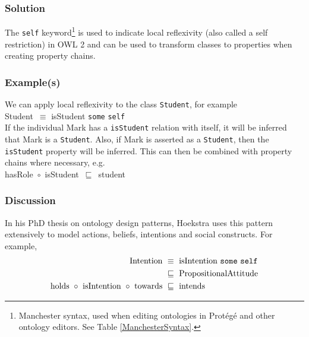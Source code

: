 \subsubsection{Solution}

\label{LocalReflexivity}
The \texttt{self} keyword\footnote{Manchester syntax, used when editing ontologies in Prot\'eg\'e and other ontology editors. See Table \ref{ManchesterSyntax}.} is used to indicate local reflexivity (also called a self restriction) in \ac{OWL} 2 and can be used to transform classes to properties when creating property chains.

\subsubsection{Example(s)}

We can apply local reflexivity to the class \texttt{Student}, for example\\

\noindent
Student~\ensuremath{\equiv} isStudent \texttt{some} \texttt{self}\\

If the individual Mark has a \texttt{isStudent} relation with itself, it will be inferred that Mark is a \texttt{Student}. Also, if Mark is asserted as a \texttt{Student}, then the \texttt{isStudent} property will be inferred. This can then be combined with property chains where necessary, e.g.\\

\noindent
hasRole~\ensuremath{\circ}~isStudent~\ensuremath{\sqsubseteq}~student

\subsubsection{Discussion}

In his PhD thesis on ontology design patterns, Hoekstra \cite{Hoekstra2009} uses this pattern extensively to model actions, beliefs, intentions and social constructs. For example,\\

\noindent
\begin{align*}
\text{Intention}~\ensuremath{&\equiv}~\text{isIntention}~\texttt{some}~\texttt{self}\\
\ensuremath{&\sqsubseteq}~\text{PropositionalAttitude}\\
\text{holds}~\ensuremath{\circ}~\text{isIntention}~\ensuremath{\circ}~\text{towards}~\ensuremath{&\sqsubseteq}~\text{intends}
\end{align*}

